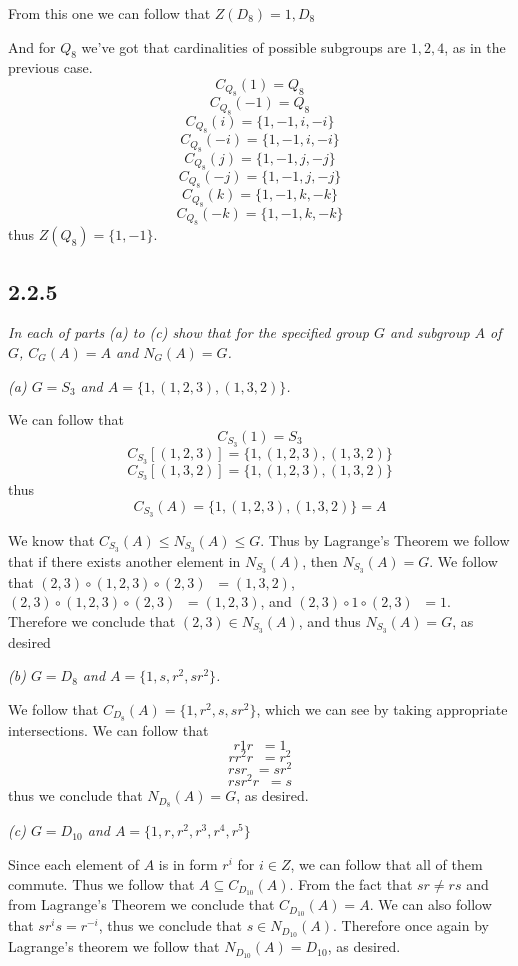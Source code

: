 \documentclass[11pt,oneside,titlepage]{book}
\DeclareMathOperator \inv {^{-1}}
\newcommand{\set}[1]{\{ #1 \}}
\begin{document}
From this one we can follow that $Z(D_8) = 1, D_8$

And for $Q_8$ we've got that cardinalities  of possible subgroups are $1, 2, 4$, as in the
previous case.
$$C_{Q_8}(1) = Q_8$$
$$C_{Q_8}(-1) = Q_8$$
$$C_{Q_8}(i) = \set{1, -1, i, -i}$$
$$C_{Q_8}(-i) = \set{1, -1, i, -i}$$
$$C_{Q_8}(j) = \set{1, -1, j, -j}$$
$$C_{Q_8}(-j) = \set{1, -1, j, -j}$$
$$C_{Q_8}(k) = \set{1, -1, k, -k}$$
$$C_{Q_8}(-k) = \set{1, -1, k, -k}$$
thus $Z(Q_8) = \set{1, -1}$.

\subsection*{2.2.5}

\textit{In each of parts (a) to (c) show that for the specified group $G$ and subgroup $A$ of $G$,
$C_G(A) = A$ and $N_G(A) = G$.}

\textit{(a) $G = S_3$ and $A = \set{1, (1, 2, 3), (1, 3, 2)}$.}

We can follow that
$$C_{S_3}(1) = S_3$$
$$C_{S_3}[(1, 2, 3)] = \set{1, (1, 2, 3), (1, 3, 2)}$$
$$C_{S_3}[(1, 3, 2)] = \set{1, (1, 2, 3), (1, 3, 2)}$$
thus
$$C_{S_3}(A) = \set{1, (1, 2, 3), (1, 3, 2)} = A$$

We know that $C_{S_3}(A) \leq N_{S_3}(A) \leq G$. Thus by Lagrange's Theorem we follow that
if there exists another element in $N_{S_3}(A)$, then $N_{S_3}(A) = G$.
We follow that  $(2, 3) \circ (1, 2, 3) \circ (2, 3)\inv = (1, 3, 2)$,
$(2, 3) \circ (1, 2, 3) \circ (2, 3)\inv = (1, 2, 3)$, and $(2, 3) \circ 1 \circ (2, 3)\inv = 1$.
Therefore we conclude that $(2, 3) \in N_{S_3}(A)$, and thus $N_{S_3}(A) = G$, as desired

\textit{(b) $G = D_8$ and $A = \set{1, s, r^2, sr^2}$.}

We follow that $C_{D_8}(A) = \set{1, r^2, s, sr^2}$, which we can see by taking
appropriate intersections. We can follow that 
$$r 1 r\inv = 1$$
$$r r^2 r\inv = r^2$$
$$r s r\inv = sr^2$$
$$r sr^2 r\inv = s$$
thus we conclude that $N_{D_8}(A) = G$, as desired.

\textit{(c) $G = D_{10}$ and $A = \set{1, r, r^2, r^3, r^4, r^5}$}

Since each element of $A$ is in form $r^i$ for $i \in Z$, we can follow that all of them commute.
Thus we follow that $A \subseteq C_{D_{10}}(A)$. From the fact that  $sr \neq rs$ and
from Lagrange's Theorem we conclude that $C_{D_{10}}(A) = A$.
We can also follow that $s r^i s = r^{-i}$, thus we conclude that $s \in N_{D_{10}}(A)$.
Therefore once again by Lagrange's theorem we follow that $N_{D_{10}}(A) = D_{10}$, as desired.
\end{document}
